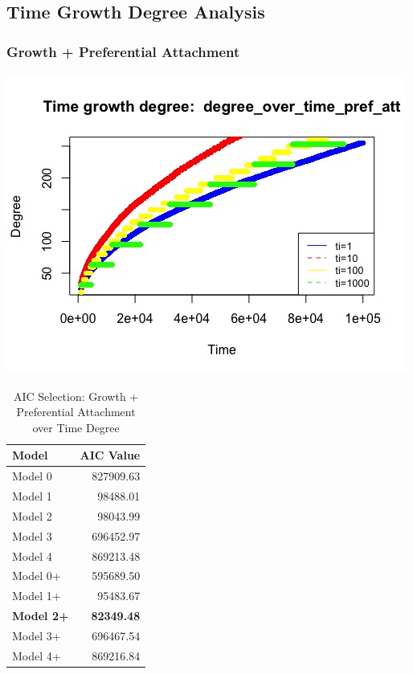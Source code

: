 \documentclass[12pt, a4paper]{article}
\begin{document}
\subsection{Time Growth Degree Analysis}

\subsubsection{Growth + Preferential Attachment}

\begin{minipage}[t]{\linewidth}
    \includegraphics[width=\textwidth]{time_growth_degree_pref_att}
    \captionsetup{type=figure}
    \label{fig:time_growth_degree_pref_att}
  \end{minipage}

\begin{table}[H]
    \centering
    \begin{tabular}{l r}
        Model & AIC Value\\
        \hline
        Model 0  &  827909.63\\
        Model 1  &  98488.01\\
        Model 2  &  98043.99\\
        Model 3  &  696452.97\\
        Model 4  &  869213.48\\
        Model 0+  &  595689.50\\
        Model 1+  &  95483.67\\
        \textbf{Model 2+} & \textbf{82349.48}\\
        Model 3+  &  696467.54\\
        Model 4+  &  869216.84\\
    \end{tabular}
    \caption{AIC Selection: Growth + Preferential Attachment over Time Degree}
    \label{table:time_grow_pref_att_1}
\end{table}
\end{document}
